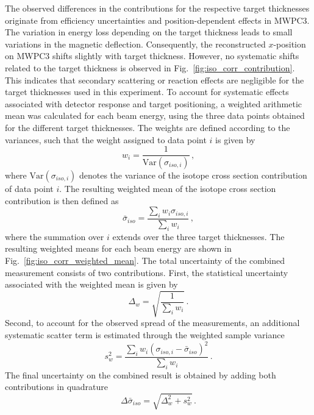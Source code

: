 The observed differences in the contributions for the respective target thicknesses originate from efficiency uncertainties and position-dependent effects in MWPC3. The variation in energy loss depending on the target thickness leads to small variations in the magnetic deflection. Consequently, the reconstructed $x$-position on MWPC3 shifts slightly with target thickness. \newline
However, no systematic shifts related to the target thickness is observed  in Fig.~\ref{fig:iso_corr_contribution}. This indicates that secondary scattering or reaction effects are negligible for the target thicknesses used in this experiment.\newline
To account for systematic effects associated with detector response and target positioning, a weighted arithmetic mean was calculated for each beam energy, using the three data points obtained for the different target thicknesses. The weights are defined according to the variances, such that the weight assigned to data point $i$ is given by
\begin{equation}
w_i = \frac{1}{\text{Var}(\sigma_{iso,i})} \, ,
\end{equation}
where $\text{Var}(\sigma_{iso,i})$ denotes the variance of the isotope cross section contribution of data point $i$. The resulting weighted mean of the isotope cross section contribution is then defined as
\begin{equation}
\bar{\sigma}_{iso} = \frac{\sum_i w_i \sigma_{iso,i}}{\sum_i w_i} \, ,
\end{equation}
where the summation over $i$ extends over the three target thicknesses. The resulting weighted means for each beam energy are shown in Fig.~\ref{fig:iso_corr_weighted_mean}. 
The total uncertainty of the combined measurement consists of two contributions.
First, the statistical uncertainty associated with the weighted mean is given by
\begin{equation}
\Delta_w = \sqrt{\frac{1}{\sum_i w_i}} \, .
\end{equation}
Second, to account for the observed spread of the measurements, an additional systematic scatter term is estimated through the weighted sample variance
\begin{equation}
s_w^2 = \frac{\sum_i w_i \left( \sigma_{iso,i} - \bar{\sigma}_{iso} \right)^2}{\sum_i w_i} \, .
\end{equation}
The final uncertainty on the combined result is obtained by adding both contributions
in quadrature
\begin{equation}
\Delta \bar{\sigma}_{iso} = \sqrt{\Delta_w^2 + s_w^2} \, .
\end{equation}

